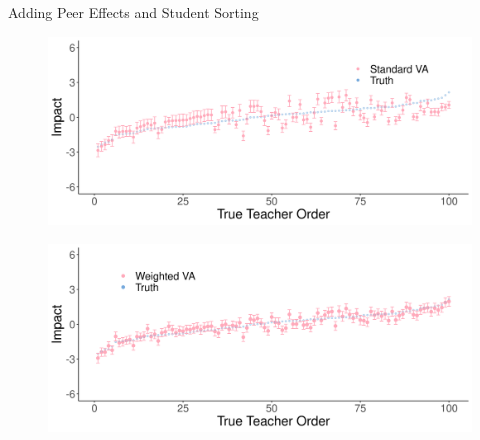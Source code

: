 \documentclass[t,aspectratio=169,11pt]{beamer}
\begin{document}

\begin{frame}{Adding Peer Effects and Student Sorting}

\hypertarget{cat2}{}
\vfill
\begin{subfigure}{.5\textwidth}
  \centering
  \includegraphics[width=\linewidth]{slides/CIERS_Figures/standard_cat_run_6.png}
\end{subfigure}%
\begin{subfigure}{.5\textwidth}
  \centering
  \includegraphics[width=\linewidth]{slides/CIERS_Figures/ww_cat_run_6.png}
\end{subfigure}

\hyperlink{run6}{}
    
\end{frame}
\end{document}
